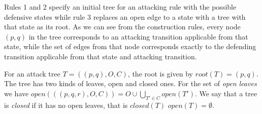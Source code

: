 \begin{definition}
  Rules 1 and 2 specify an initial tree for an attacking rule with the possible defensive
  states while rule 3 replaces an open edge to a state with a tree with that state as its
  root.
  As we can see from the construction rules, every node $(p,q)$ in the tree corresponds
  to an attacking transition applicable from that state, while the set of edges from that node
  corresponds exactly to the defending transition applicable from that state and attacking transition.

  For an attack tree $T = ((p,q),O,C)$, the root is given by $root(T) = (p,q)$.
  The tree has two kinds of leaves, open and closed ones. For the set
  of \emph{open leaves} we have
  $open(((p,q,r), O, C)) = O ∪ ⋃_{T' ∈ C} open(T')$.
  We say that a tree is \emph{closed} if it has no open leaves, that is
  $closed(T)$ \iff $open(T) = ∅$.


  


\end{definition}

